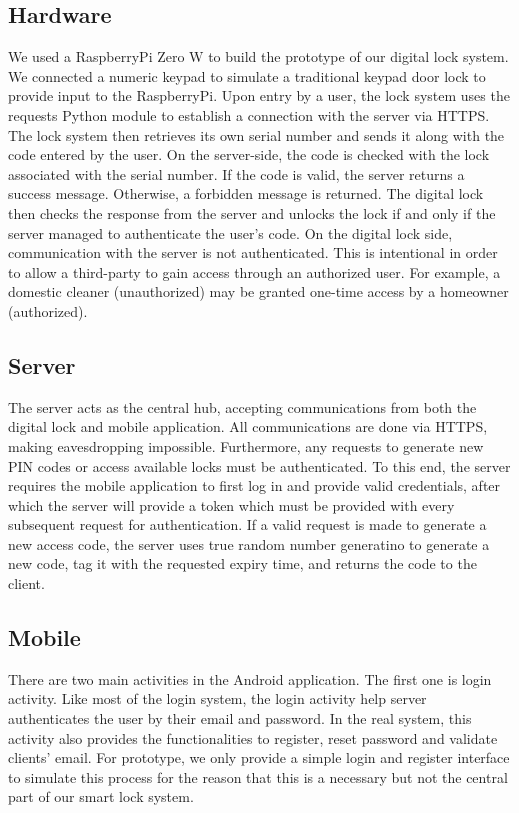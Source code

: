\documentclass[conference]{IEEEtran}
\begin{document}
\subsection{Hardware}
	We used a RaspberryPi Zero W to build the prototype of our digital lock system. We connected a numeric keypad to simulate a traditional keypad door lock to provide input to the RaspberryPi. Upon entry by a user, the lock system uses the requests Python module to establish a connection with the server via HTTPS. The lock system then retrieves its own serial number and sends it along with the code entered by the user. On the server-side, the code is checked with the lock associated with the serial number. If the code is valid, the server returns a success message. Otherwise, a forbidden message is returned. The digital lock then checks the response from the server and unlocks the lock if and only if the server managed to authenticate the user’s code. On the digital lock side, communication with the server is not authenticated. This is intentional in order to allow a third-party to gain access through an authorized user. For example, a domestic cleaner (unauthorized) may be granted one-time access by a homeowner (authorized).
\subsection{Server}
The server acts as the central hub, accepting communications from both the digital lock and mobile application. All communications are done via HTTPS, making eavesdropping impossible. Furthermore, any requests to generate new PIN codes or access available locks must be authenticated. To this end, the server requires the mobile application to first log in and provide valid credentials, after which the server will provide a token which must be provided with every subsequent request for authentication. If a valid request is made to generate a new access code, the server uses true random number generatino to generate a new code, tag it with the requested expiry time, and returns the code to the client.

\subsection{Mobile}
There are two main activities in the Android application. The first one is login activity. Like most of the login system, the login activity help server authenticates the user by their email and password. In the real system, this activity also provides the functionalities to register, reset password and validate clients’ email. For prototype, we only provide a simple login and register interface to simulate this process for the reason that this is a necessary but not the central part of our smart lock system.
\end{document}
